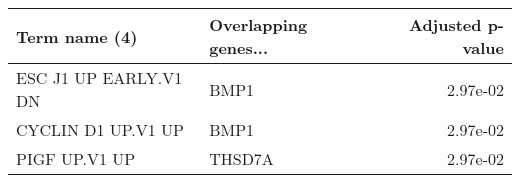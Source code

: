 \begin{tabular}{llr}
\toprule
        Term name (4) & Overlapping genes... &  Adjusted p-value \\
\midrule
ESC J1 UP EARLY.V1 DN &                 BMP1 &          2.97e-02 \\
   CYCLIN D1 UP.V1 UP &                 BMP1 &          2.97e-02 \\
        PIGF UP.V1 UP &               THSD7A &          2.97e-02 \\
\bottomrule
\end{tabular}
